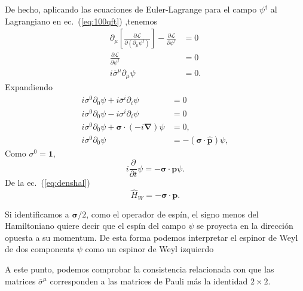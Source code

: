 \begin{frame}
De hecho, aplicando las ecuaciones de Euler-Lagrange para el campo $\psi^\dagger$ al Lagrangiano en ec.~(\ref{eq:100qft}) ,tenemos
\begin{align}
  \partial_\mu\left[\frac{\partial\mathcal{L}}{\partial\left(\partial_\mu\psi^\dagger\right)}\right]-\frac{\partial\mathcal{L}}{\partial\psi^\dagger}&=0\nonumber\\
  \frac{\partial\mathcal{L}}{\partial\psi^\dagger}&=0\nonumber\\
  \label{eq:114qftm}
  i \overline{\sigma}^\mu\partial_\mu\psi&=0.
\end{align}
Expandiendo
\begin{align*}
    i \sigma^0\partial_0\psi+i \overline{\sigma}^i\partial_i\psi&=0\\
  i \sigma^0\partial_0\psi-i \sigma^i\partial_i\psi&=0\\
  i \sigma^0\partial_0\psi+\boldsymbol\sigma\cdot(-i\boldsymbol{\nabla})\psi&=0,\\
  i \sigma^0\partial_0\psi&=-(\boldsymbol\sigma\cdot\hat{\mathbf{p}})\psi,
\end{align*}
Como $\sigma^0=\mathbf{1}$,
\begin{equation}
  \label{eq:wspinorL}
    i\frac{\partial}{\partial t}\psi=-\boldsymbol\sigma\cdot\mathbf{p}\psi.
\end{equation}
De la ec.~(\ref{eq:denshal})
\begin{equation}
  \label{eq:186qft}
  \hat{H}_{W}= -\boldsymbol\sigma\cdot\mathbf{p}.
\end{equation}
\end{frame}
Si identificamos a $\boldsymbol{\sigma}/2$, como el operador de espín, el signo menos del Hamiltoniano quiere decir que el espín del campo $\psi$ se proyecta en la dirección opuesta a su momentum. 
De esta forma podemos interpretar el espinor de Weyl de dos components $\psi$ como un espinor de Weyl izquierdo


A este punto, podemos comprobar la consistencia relacionada con que las matrices $\overline{\sigma}^\mu$ corresponden a las matrices de Pauli más la identidad $2\times2$.

